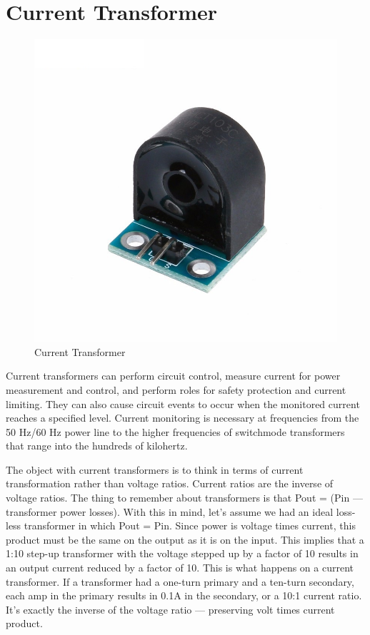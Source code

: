 \section{Current Transformer}{

\begin{figure}[H]
	\includegraphics[scale=0.45]{images/CT2.jpg}
	\centering
	
	\caption{Current Transformer}
	\label{Current Transformer}
\end{figure}
Current transformers can perform circuit control, measure current for power measurement and control, and perform roles for safety protection and current limiting. They can also cause circuit events to occur when the monitored current reaches a specified level. Current monitoring is necessary at frequencies from the 50 Hz/60 Hz power line to the higher frequencies of switchmode transformers that range into the hundreds of kilohertz.

The object with current transformers is to think in terms of current transformation rather than voltage ratios. Current ratios are the inverse of voltage ratios. The thing to remember about transformers is that Pout = (Pin — transformer power losses). With this in mind, let's assume we had an ideal loss-less transformer in which Pout = Pin. Since power is voltage times current, this product must be the same on the output as it is on the input. This implies that a 1:10 step-up transformer with the voltage stepped up by a factor of 10 results in an output current reduced by a factor of 10. This is what happens on a current transformer. If a transformer had a one-turn primary and a ten-turn secondary, each amp in the primary results in 0.1A in the secondary, or a 10:1 current ratio. It's exactly the inverse of the voltage ratio — preserving volt times current product.

}
